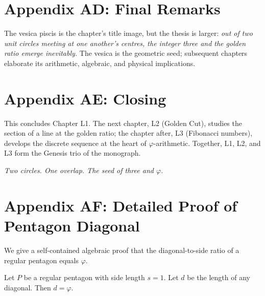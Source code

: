 \section*{Appendix AD: Final Remarks}
\label{sec:01-app-AD}

The vesica piscis is the chapter's title image, but the thesis is
larger: \emph{out of two unit circles meeting at one another's centres,
the integer three and the golden ratio emerge inevitably.} The
vesica is the geometric seed; subsequent chapters elaborate its
arithmetic, algebraic, and physical implications.

\section*{Appendix AE: Closing}
\label{sec:01-app-AE}

This concludes Chapter L1. The next chapter, L2 (Golden Cut), studies
the section of a line at the golden ratio; the chapter after, L3
(Fibonacci numbers), develops the discrete sequence at the heart of
$\varphi$-arithmetic. Together, L1, L2, and L3 form the Genesis trio
of the monograph.

\bigskip
\centerline{\textit{Two circles. One overlap. The seed of three and $\varphi$.}}
\bigskip



\section*{Appendix AF: Detailed Proof of Pentagon Diagonal}
\label{sec:01-app-AF}

We give a self-contained algebraic proof that the diagonal-to-side
ratio of a regular pentagon equals $\varphi$.

\begin{theorem}
\label{thm:01-pentagon-alg}
Let $P$ be a regular pentagon with side length $s = 1$. Let $d$ be
the length of any diagonal. Then $d = \varphi$.
\end{theorem}


